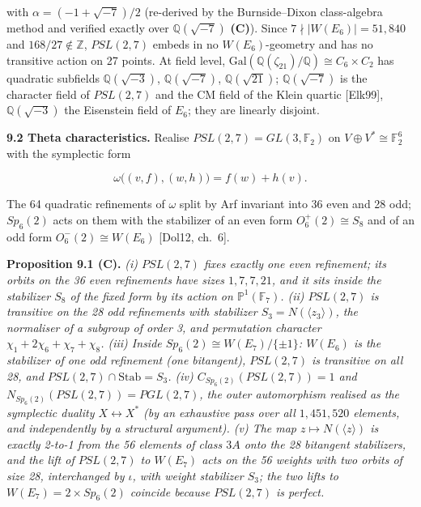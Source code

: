 \documentclass[
]{article}
\begin{document}
with \(\alpha = (-1 + \sqrt{-7})/2\) (re-derived by the Burnside--Dixon
class-algebra method and verified exactly over \(\mathbb{Q}(\sqrt{-7})\)
\textbf{(C)}). Since \(7 \nmid |W(E_6)| = 51{,}840\) and
\(168/27 \notin \mathbb{Z}\), \(PSL(2,7)\) embeds in no
\(W(E_6)\)-geometry and has no transitive action on 27 points. At field
level,
\(\mathrm{Gal}(\mathbb{Q}(\zeta_{21})/\mathbb{Q}) \cong C_6 \times C_2\)
has quadratic subfields \(\mathbb{Q}(\sqrt{-3})\),
\(\mathbb{Q}(\sqrt{-7})\), \(\mathbb{Q}(\sqrt{21})\);
\(\mathbb{Q}(\sqrt{-7})\) is the character field of \(PSL(2,7)\) and the
CM field of the Klein quartic {[}Elk99{]}, \(\mathbb{Q}(\sqrt{-3})\) the
Eisenstein field of \(E_6\); they are linearly disjoint.

\textbf{9.2 Theta characteristics.} Realise
\(PSL(2,7) = GL(3,\mathbb{F}_2)\) on
\(V \oplus V^* \cong \mathbb{F}_2^6\) with the symplectic form

\[\omega\big((v,f),(w,h)\big) = f(w) + h(v) .\]

The 64 quadratic refinements of \(\omega\) split by Arf invariant into
36 even and 28 odd; \(Sp_6(2)\) acts on them with the stabilizer of an
even form \(O_6^+(2) \cong S_8\) and of an odd form
\(O_6^-(2) \cong W(E_6)\) {[}Dol12, ch.~6{]}.

\textbf{Proposition 9.1 (C).} \emph{(i) \(PSL(2,7)\) fixes exactly one
even refinement; its orbits on the 36 even refinements have sizes
\(1, 7, 7, 21\), and it sits inside the stabilizer \(S_8\) of the fixed
form by its action on \(\mathbb{P}^1(\mathbb{F}_7)\). (ii) \(PSL(2,7)\)
is transitive on the 28 odd refinements with stabilizer
\(S_3 = N(\langle z_3 \rangle)\), the normaliser of a subgroup of order
3, and permutation character \(\chi_1 + 2\chi_6 + \chi_7 + \chi_8\).
(iii) Inside \(Sp_6(2) \cong W(E_7)/\{\pm 1\}\): \(W(E_6)\) is the
stabilizer of one odd refinement (one bitangent), \(PSL(2,7)\) is
transitive on all 28, and \(PSL(2,7) \cap \mathrm{Stab} = S_3\). (iv)
\(C_{Sp_6(2)}(PSL(2,7)) = 1\) and \(N_{Sp_6(2)}(PSL(2,7)) = PGL(2,7)\),
the outer automorphism realised as the symplectic duality
\(X \leftrightarrow X^*\) (by an exhaustive pass over all
\(1{,}451{,}520\) elements, and independently by a structural argument).
(v) The map \(z \mapsto N(\langle z \rangle)\) is exactly 2-to-1 from
the 56 elements of class \(3A\) onto the 28 bitangent stabilizers, and
the lift of \(PSL(2,7)\) to \(W(E_7)\) acts on the 56 weights with two
orbits of size 28, interchanged by \(\iota\), with weight stabilizer
\(S_3\); the two lifts to \(W(E_7) = 2 \times Sp_6(2)\) coincide because
\(PSL(2,7)\) is perfect.}
\end{document}
